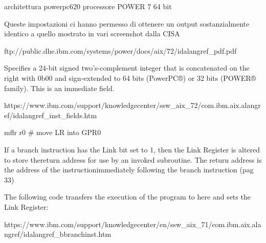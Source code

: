 \documentclass[10pt,a4paper, titlepage]{report}
\begin{document}
architettura powerpc620
processore POWER 7
64 bit

Queste impostazioni ci hanno permesso di ottenere un output sostanzialmente identico a quello mostrato in vari screenshot dalla CISA




ftp://public.dhe.ibm.com/systems/power/docs/aix/72/idalangref\_pdf.pdf



    
 	Specifies a 24-bit signed two's-complement integer that is concatenated on the right with 0b00 and sign-extended to 64 bits (PowerPC®) or 32 bits (POWER® family). This is an immediate field.

 	https://www.ibm.com/support/knowledgecenter/ssw\_aix\_72/com.ibm.aix.alangref/idalangref\_inst\_fields.htm
 	
 	mflr r0 \# move LR into GPR0
 	
 	 If a branch instruction has the Link bit set to 1, then the Link Register is altered to store thereturn address for use by an invoked subroutine. The return address is the address of the instructionimmediately following the branch instruction (pag 33)


The following code transfers the execution of the program to here and sets the Link Register: 

https://www.ibm.com/support/knowledgecenter/en/ssw\_aix\_71/com.ibm.aix.alangref/idalangref\_bbranchinst.htm


\listoffigures
\listoftables
\lstlistoflistings
\end{document}
